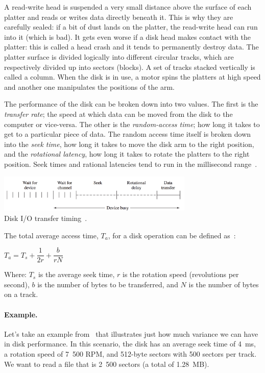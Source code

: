 A read-write head is suspended a very small distance above the surface of each platter and reads or writes data directly beneath it. This is why they are carefully sealed: if a bit of dust lands on the platter, the read-write head can run into it (which is bad). It gets even worse if a disk head makes contact with the platter: this is called a head crash and it tends to permanently destroy data. The platter surface is divided logically into different circular tracks, which are respectively divided up into sectors (blocks). A set of tracks stacked vertically is called a column. When the disk is in use, a motor spins the platters at high speed and another one manipulates the positions of the arm.

The performance of the disk can be broken down into two values. The first is the \textit{transfer rate}; the speed at which data can be moved from the disk to the computer or vice-versa. The other is the \textit{random-access time}; how long it takes to get to a particular piece of data. The random access time itself is broken down into the \textit{seek time}, how long it takes to move the disk arm to the right position, and the \textit{rotational latency}, how long it takes to rotate the platters to the right position. Seek times and rational latencies tend to run in the millisecond range~\cite{osc}.

\begin{center}
	\includegraphics[width=0.7\textwidth]{images/disk-transfer-time.png}\\
	Disk I/O transfer timing~\cite{osi}.
\end{center}

The total average access time, $T_{a}$, for a disk operation can be defined as~\cite{osi}:

\begin{center}
$T_{a} = T_{s} + \dfrac{1}{2r} + \dfrac{b}{rN}$
\end{center}
Where: $T_{s}$ is the average seek time, $r$ is the rotation speed (revolutions per second), $b$ is the number of bytes to be transferred, and $N$ is the number of bytes on a track.

\paragraph{Example.} Let's take an example from~\cite{osi} that illustrates just how much variance we can have in disk performance. In this scenario, the disk has an average seek time of 4~ms, a rotation speed of 7~500 RPM, and 512-byte sectors with 500 sectors per track. We want to read a file that is 2~500 sectors (a total of 1.28~MB). 

